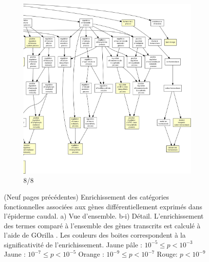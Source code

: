 \begin{figure}[!htp]
\ContinuedFloat
\begin{subfigure}{\textwidth}
\includegraphics[width=\textwidth]
{Figures/tfc-go-all-graph/tfc-go-all-graph_7.png}
\caption{8/8}
\end{subfigure}
\caption[Enrichissement des catégories fonctionnelles associées aux gènes différentiellement exprimés dans l'épiderme caudal]
{
(Neuf pages précédentes) Enrichissement des catégories fonctionnelles associées aux gènes différentiellement exprimés dans l'épiderme caudal.
a) Vue d'ensemble.
b-i) Détail.
L'enrichissement des termes comparé à l'ensemble des gènes transcrits est calculé à l'aide de GOrilla \citep{Eden2009}.
Les couleurs des boites correspondent à la significativité de l'enrichissement.
Jaune pâle : $10^{-5} \leq p < 10^{-3}$
Jaune : $10^{-7} \leq p < 10^{-5}$
Orange : $10^{-9} \leq p < 10^{-7}$
Rouge: $p < 10^{-9}$
}
\label{fig:tfc-go-all-graph}
\end{figure}